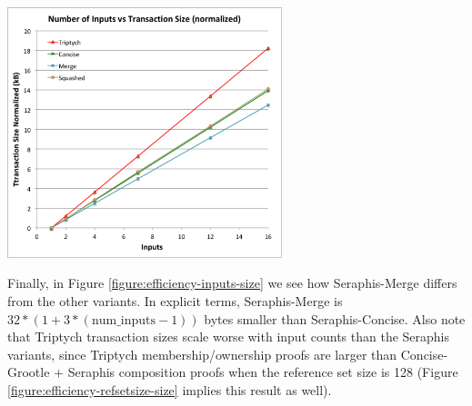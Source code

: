 \begin{center}
    \includegraphics[width=8cm]{figures/inputs_size.png}
    \label{figure:efficiency-inputs-size}
\end{center}

Finally, in Figure \ref{figure:efficiency-inputs-size} we see how Seraphis-Merge differs from the other variants. In explicit terms, Seraphis-Merge is $32*(1 + 3*(\textrm{num\_inputs} - 1))$ bytes smaller than Seraphis-Concise. Also note that Triptych transaction sizes scale worse with input counts than the Seraphis variants, since Triptych membership/ownership proofs are larger than Concise-Grootle + Seraphis composition proofs when the reference set size is 128 (Figure \ref{figure:efficiency-refsetsize-size} implies this result as well).
